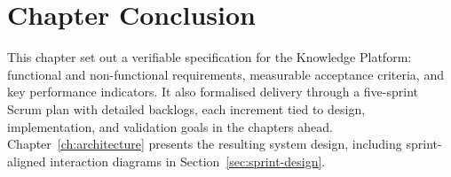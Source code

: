 \section{Chapter Conclusion}

This chapter set out a verifiable specification for the Knowledge Platform:
functional and non-functional requirements, measurable acceptance criteria, and
key performance indicators. It also formalised delivery through a five-sprint
Scrum plan with detailed backlogs, each increment tied to design, implementation,
and validation goals in the chapters ahead.
Chapter~\ref{ch:architecture} presents the resulting system design, including
sprint-aligned interaction diagrams in Section~\ref{sec:sprint-design}.
